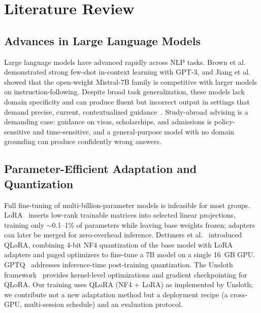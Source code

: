 \documentclass[11pt, a4paper]{article}
\begin{document}
\section{Literature Review}

\subsection{Advances in Large Language Models}
Large language models have advanced rapidly across NLP tasks. Brown et al.~\cite{brown2020} demonstrated strong few-shot in-context learning with GPT-3, and Jiang et al.~\cite{jiang2023} showed that the open-weight Mistral-7B family is competitive with larger models on instruction-following. Despite broad task generalization, these models lack domain specificity and can produce fluent but incorrect output in settings that demand precise, current, contextualized guidance~\cite{ippolito2020}. Study-abroad advising is a demanding case: guidance on visas, scholarships, and admissions is policy-sensitive and time-sensitive, and a general-purpose model with no domain grounding can produce confidently wrong answers.

\subsection{Parameter-Efficient Adaptation and Quantization}
Full fine-tuning of multi-billion-parameter models is infeasible for most groups. LoRA~\cite{hu2021} inserts low-rank trainable matrices into selected linear projections, training only $\sim$0.1--1\% of parameters while leaving base weights frozen; adapters can later be merged for zero-overhead inference. Dettmers et al.~\cite{dettmers2023} introduced QLoRA, combining 4-bit NF4 quantization of the base model with LoRA adapters and paged optimizers to fine-tune a 7B model on a single 16~GB GPU. GPTQ~\cite{frantar2022} addresses inference-time post-training quantization. The Unsloth framework~\cite{unsloth2024} provides kernel-level optimizations and gradient checkpointing for QLoRA. Our training uses QLoRA (NF4 + LoRA) as implemented by Unsloth; we contribute not a new adaptation method but a deployment recipe (a cross-GPU, multi-session schedule) and an evaluation protocol.
\end{document}
